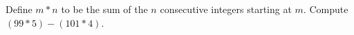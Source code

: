 Define $m*n$ to be the sum of the $n$ consecutive integers starting at $m$. Compute $(99*5)-(101*4)$.

